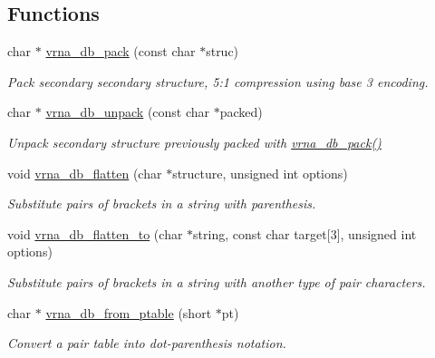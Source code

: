 \subsection*{Functions}
\begin{DoxyCompactItemize}
\item 
char $\ast$ \hyperlink{group__struct__utils__dot__bracket_ga55c4783060a1464f862f858d5599c9e1}{vrna\+\_\+db\+\_\+pack} (const char $\ast$struc)
\begin{DoxyCompactList}\small\item\em Pack secondary secondary structure, 5\+:1 compression using base 3 encoding. \end{DoxyCompactList}\item 
char $\ast$ \hyperlink{group__struct__utils__dot__bracket_ga6490adff857d84ce06e6f379ae3a4512}{vrna\+\_\+db\+\_\+unpack} (const char $\ast$packed)
\begin{DoxyCompactList}\small\item\em Unpack secondary structure previously packed with \hyperlink{group__struct__utils__dot__bracket_ga55c4783060a1464f862f858d5599c9e1}{vrna\+\_\+db\+\_\+pack()} \end{DoxyCompactList}\item 
void \hyperlink{group__struct__utils__dot__bracket_gae966b9f44168a4f4b39ca42ffb5f37b7}{vrna\+\_\+db\+\_\+flatten} (char $\ast$structure, unsigned int options)
\begin{DoxyCompactList}\small\item\em Substitute pairs of brackets in a string with parenthesis. \end{DoxyCompactList}\item 
void \hyperlink{group__struct__utils__dot__bracket_ga690425199c8b71545e7196e3af1436f8}{vrna\+\_\+db\+\_\+flatten\+\_\+to} (char $\ast$string, const char target\mbox{[}3\mbox{]}, unsigned int options)
\begin{DoxyCompactList}\small\item\em Substitute pairs of brackets in a string with another type of pair characters. \end{DoxyCompactList}\item 
char $\ast$ \hyperlink{group__struct__utils__dot__bracket_gaf9ecd0d7877fecdbb0292e24f40283d5}{vrna\+\_\+db\+\_\+from\+\_\+ptable} (short $\ast$pt)
\begin{DoxyCompactList}\small\item\em Convert a pair table into dot-\/parenthesis notation. \end{DoxyCompactList}\item 

\end{DoxyCompactItemize}
